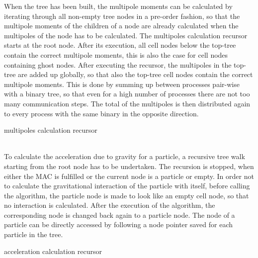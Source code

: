 When the tree has been built, the multipole moments can be calculated by iterating through all non-empty tree nodes in a pre-order fashion, so that the multipole moments of the children of a node are already calculated when the multipoles of the node has to be calculated. The multipoles calculation recursor starts at the root node. After its execution, all cell nodes below the top-tree contain the correct multipole moments, this is also the case for cell nodes containing ghost nodes. After executing the recursor, the multipoles in the top-tree are added up globally, so that also the top-tree cell nodes contain the correct multipole moments. This is done by summing up between processes pair-wise with a binary tree, so that even for a high number of processes there are not too many communication steps. The total of the multipoles is then distributed again to every process with the same binary in the opposite direction.
\begin{algorithm}
\caption{multipoles calculation recursor}
\begin{algorithmic}
\label{alg:multipolecalc}
\ELSE
{}
\ENDIF
\ENDFOR
\ENDIF
\end{algorithmic}
\end{algorithm}
\\

To calculate the acceleration due to gravity for a particle, a recursive tree walk starting from the root node has to be undertaken. The recursion is stopped, when either the MAC is fulfilled or the current node is a particle or empty. In order not to calculate the gravitational interaction of the particle with itself, before calling the algorithm, the particle node is made to look like an empty cell node, so that no interaction is calculated. After the execution of the algorithm, the corresponding node is changed back again to a particle node. The node of a particle can be directly accessed by following a node pointer saved for each particle in the tree. 
\begin{algorithm}
\caption{acceleration calculation recursor}
\begin{algorithmic}
\label{alg:calcgravity}
\ELSE
{}
\ENDFOR
\ENDIF
\end{algorithmic}
\end{algorithm}\\

